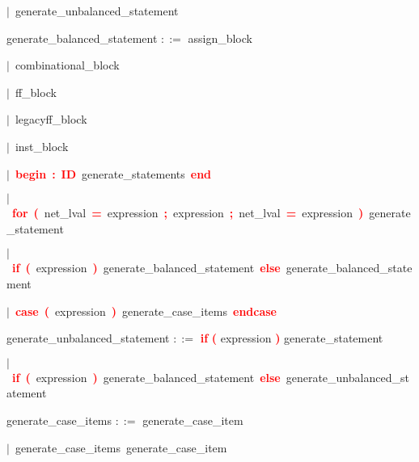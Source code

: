 \mbox{$|$ generate\_unbalanced\_statement}

\vspace{1em}
\noindent
\settowidth{\parindent}{\hspace{4ex}}
generate\_balanced\_statement $::=$\hspace{1ex} assign\_block

\mbox{$|$ combinational\_block}

\mbox{$|$ ff\_block}

\mbox{$|$ legacyff\_block}

\mbox{$|$ inst\_block}

\mbox{$|$ \textbf{\textcolor{red}{begin}} \textbf{\textcolor{red}{:}} \textbf{\textcolor{red}{ID}} generate\_statements \textbf{\textcolor{red}{end}}}

\mbox{$|$ \textbf{\textcolor{red}{for}} \textbf{\textcolor{red}{(}} net\_lval \textbf{\textcolor{red}{=}} expression \textbf{\textcolor{red}{;}} expression \textbf{\textcolor{red}{;}} net\_lval \textbf{\textcolor{red}{=}} expression \textbf{\textcolor{red}{)}} generate\_statement}

\mbox{$|$ \textbf{\textcolor{red}{if}} \textbf{\textcolor{red}{(}} expression \textbf{\textcolor{red}{)}} generate\_balanced\_statement \textbf{\textcolor{red}{else}} generate\_balanced\_statement}

\mbox{$|$ \textbf{\textcolor{red}{case}} \textbf{\textcolor{red}{(}} expression \textbf{\textcolor{red}{)}} generate\_case\_items \textbf{\textcolor{red}{endcase}}}

\vspace{1em}
\noindent
\settowidth{\parindent}{\hspace{4ex}}
generate\_unbalanced\_statement $::=$\hspace{1ex} \textbf{\textcolor{red}{if}} \textbf{\textcolor{red}{(}} expression \textbf{\textcolor{red}{)}} generate\_statement

\mbox{$|$ \textbf{\textcolor{red}{if}} \textbf{\textcolor{red}{(}} expression \textbf{\textcolor{red}{)}} generate\_balanced\_statement \textbf{\textcolor{red}{else}} generate\_unbalanced\_statement}

\vspace{1em}
\noindent
\settowidth{\parindent}{\hspace{4ex}}
generate\_case\_items $::=$\hspace{1ex} generate\_case\_item

\mbox{$|$ generate\_case\_items generate\_case\_item}

